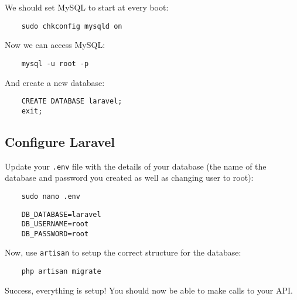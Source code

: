 \pagebreak

We should set MySQL to start at every boot:

\begin{verbatim}
    sudo chkconfig mysqld on
\end{verbatim}

Now we can access MySQL:

\begin{verbatim}
    mysql -u root -p
\end{verbatim}

And create a new database:

\begin{verbatim}
    CREATE DATABASE laravel;
    exit;
\end{verbatim}

\subsection{Configure Laravel}

Update your \texttt{.env} file with the details of your database (the name of the database and password you created as well as changing user to root):

\begin{verbatim}
    sudo nano .env
\end{verbatim}

\begin{verbatim}
    DB_DATABASE=laravel
    DB_USERNAME=root
    DB_PASSWORD=root
\end{verbatim}

Now, use \texttt{artisan} to setup the correct structure for the database:

\begin{verbatim}
    php artisan migrate
\end{verbatim}

Success, everything is setup! You should now be able to make calls to your API.

\pagebreak

